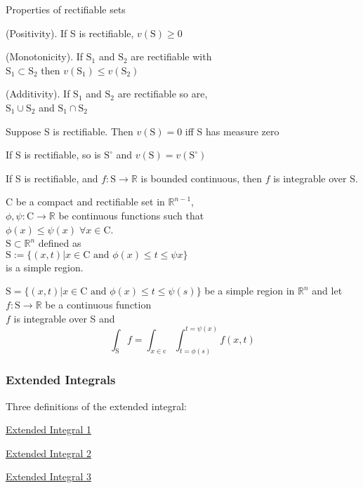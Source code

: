 Properties of rectifiable sets
\begin{myenumerate}
\item (Positivity). If S is rectifiable, $v(\mathrm{S})\geq 0$
\item (Monotonicity). If $\mathrm{S}_1$ and $\mathrm{S}_2$ are rectifiable with\\ 
$\mathrm{S}_1\subset\mathrm{S}_2$ then $v(\mathrm{S}_1)\leq v(\mathrm{S}_2)$
\item (Additivity). If $\mathrm{S}_1$ and $\mathrm{S}_2$ are rectifiable so are,\\
$\mathrm{S}_1\cup\mathrm{S}_2$ and $\mathrm{S}_1\cap\mathrm{S}_2$
\item Suppose S is rectifiable. Then $v(\mathrm{S})=0$ iff S has measure zero
\item If S is rectifiable, so is $\mathrm{S^{\circ}}$ and $v(\mathrm{S})=v(\mathrm{S}^{\circ})$
\item If S is rectifiable, and $f:\mathrm{S}\to\mathbb{R}$ is bounded continuous, 
then $f$ is integrable over S.
\end{myenumerate}


\LET C be a compact and rectifiable set in $\mathbb{R}^{n-1}$,\\
$\phi,\psi:\mathrm{C}\to\mathbb{R}$ be continuous functions such that\\ 
$\phi(x)\leq\psi(x)\;\forall x\in\mathrm{C}$.\\
\THEN $\mathrm{S}\subset\mathbb{R}^n$ defined as \\
$\mathrm{S}:=\{(x,t)|x\in\mathrm{C}\text{ and } \phi(x)\leq t\leq\psi{x}\}$\\
is a simple region.

\LET 
$\mathrm{S}=\{(x,t)| x\in\mathrm{C}\text{ and } \phi(x)\leq t\leq\psi(s)\}$
be a simple region in $\mathbb{R}^n$ and let
$f:\mathrm{S}\to\mathbb{R}$ be a continuous function\\
\THEN $f$ is integrable over S and\\
$$\int_{\mathrm{S}}f = \int_{x\in\mathrm{c}}\int_{t=\phi(s)}^{t=\psi(x)}f(x,t)$$

\subsubsection{Extended Integrals}
Three definitions of the extended integral:
\begin{myenumerate}
\item\hyperref[defn:extended integral]{Extended Integral 1}
\item\hyperref[thm:mnk 15.2]{Extended Integral 2}
\item\hyperref[thm:mnk 16.5]{Extended Integral 3}
\end{myenumerate}

